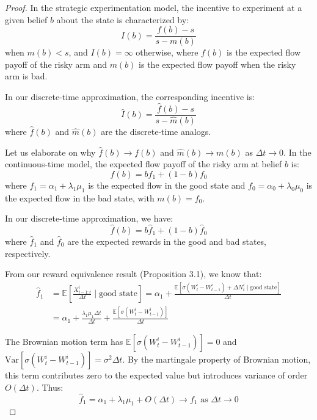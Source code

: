 \begin{proof}
In the strategic experimentation model, the incentive to experiment at a given belief $b$ about the state is characterized by:
\begin{equation}
    I(b) = \frac{f(b) - s}{s - m(b)}
\end{equation}
when $m(b) < s$, and $I(b) = \infty$ otherwise, where $f(b)$ is the expected flow payoff of the risky arm and $m(b)$ is the expected flow payoff when the risky arm is bad.

In our discrete-time approximation, the corresponding incentive is:
\begin{equation}
    \hat{I}(b) = \frac{\hat{f}(b) - s}{s - \hat{m}(b)}
\end{equation}
where $\hat{f}(b)$ and $\hat{m}(b)$ are the discrete-time analogs.

Let us elaborate on why $\hat{f}(b) \to f(b)$ and $\hat{m}(b) \to m(b)$ as $\Delta t \to 0$. In the continuous-time model, the expected flow payoff of the risky arm at belief $b$ is:
\begin{equation}
    f(b) = b f_1 + (1-b) f_0
\end{equation}
where $f_1 = \alpha_1 + \lambda_1\mu_1$ is the expected flow in the good state and $f_0 = \alpha_0 + \lambda_0\mu_0$ is the expected flow in the bad state, with $m(b) = f_0$.

In our discrete-time approximation, we have:
\begin{equation}
    \hat{f}(b) = b \hat{f}_1 + (1-b) \hat{f}_0
\end{equation}
where $\hat{f}_1$ and $\hat{f}_0$ are the expected rewards in the good and bad states, respectively.

From our reward equivalence result (Proposition 3.1), we know that:
\begin{align}
    \hat{f}_1 &= \mathbb{E}\left[\frac{X^i_{t-1:t}}{\Delta t} \mid \text{good state}\right] = \alpha_1 + \frac{\mathbb{E}[\sigma(W^i_t - W^i_{t-1}) + \Delta N^i_t \mid \text{good state}]}{\Delta t} \\
    &= \alpha_1 + \frac{\lambda_1\mu_1\Delta t}{\Delta t} + \frac{\mathbb{E}[\sigma(W^i_t - W^i_{t-1})]}{\Delta t}
\end{align}

The Brownian motion term has $\mathbb{E}[\sigma(W^i_t - W^i_{t-1})] = 0$ and $\text{Var}[\sigma(W^i_t - W^i_{t-1})] = \sigma^2 \Delta t$. By the martingale property of Brownian motion, this term contributes zero to the expected value but introduces variance of order $O(\Delta t)$. Thus:
\begin{equation}
    \hat{f}_1 = \alpha_1 + \lambda_1\mu_1 + O(\Delta t) \to f_1 \text{ as } \Delta t \to 0
\end{equation}


\end{proof}
